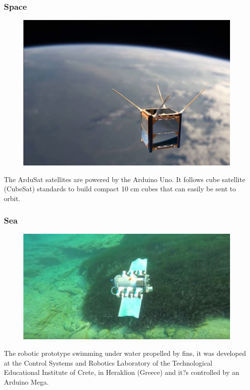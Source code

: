 \begin{frame}
	\frametitle{Space}
	\begin{figure}
		\includegraphics[scale=.3]{assets/sat}  
	\end{figure}
	The ArduSat satellites are powered by the Arduino Uno. It follows cube satellite (CubeSat) standards to build compact 10 cm cubes that can easily be sent to orbit. 
\end{frame}

\begin{frame}
	\frametitle{Sea}
	\begin{figure}
		\includegraphics[scale=.4]{assets/sea}  
	\end{figure}
	The robotic prototype swimming under water propelled by fins, it was developed at the Control Systems and Robotics Laboratory of the Technological Educational Institute of Crete, in Heraklion (Greece) and it?s controlled by an Arduino Mega.
\end{frame}

